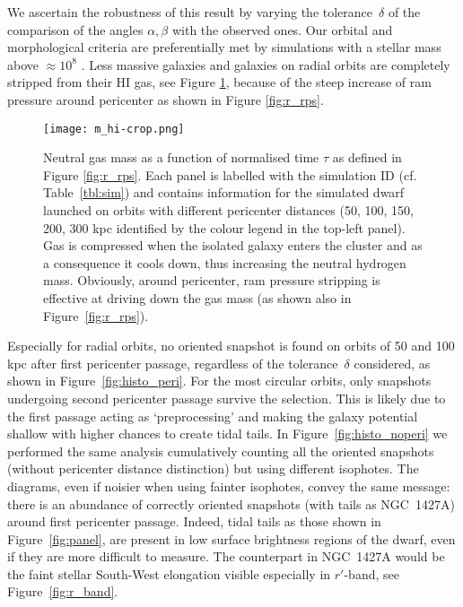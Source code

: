 We ascertain the robustness of this result by varying the tolerance~$\delta$ of the comparison of the angles $\alpha, \beta$ with the observed ones.
Our orbital and morphological criteria are preferentially met by simulations with a stellar mass above $ \approx10^8 $ \Msun{}.
Less massive galaxies and galaxies on radial orbits are completely stripped from their HI gas, see Figure \ref{fig:m_hi}, because of the steep increase of ram pressure around pericenter as shown in Figure \ref{fig:r_rps}.
\begin{figure}
\centering
\texttt{[image: m\_hi-crop.png]}
\caption{Neutral gas mass as a function of normalised time $\tau$ as defined in Figure \ref{fig:r_rps}.
Each panel is labelled with the simulation ID (cf. Table~\ref{tbl:sim}) and contains information for the simulated dwarf launched on orbits with different pericenter distances (50, 100, 150, 200, 300 kpc identified by the colour legend in the top-left panel). Gas is compressed when the isolated galaxy enters the cluster and as a consequence it cools down, thus increasing the neutral hydrogen mass. Obviously, around pericenter, ram pressure stripping is effective at driving down the gas mass (as shown also in Figure~\ref{fig:r_rps}).
}
\label{fig:m_hi}
\end{figure}
Especially for radial orbits, no oriented snapshot is found on orbits of 50 and 100 kpc after first pericenter passage, regardless of the tolerance~$\delta$ considered, as shown in Figure~\ref{fig:histo_peri}.
For the most circular orbits, only snapshots undergoing second pericenter passage survive the selection. This is likely due to the first passage acting as `preprocessing' and making the galaxy potential shallow with higher chances to create tidal tails.
In Figure~\ref{fig:histo_noperi} we performed the same analysis cumulatively counting all the oriented snapshots (without pericenter distance distinction) but using different isophotes.
The diagrams, even if noisier when using fainter isophotes, convey the same message: there is an abundance of correctly oriented snapshots (with tails as NGC~1427A) around first pericenter passage.
Indeed, tidal tails as those shown in Figure~\ref{fig:panel}, are present in low surface brightness regions of the dwarf, even if they are more difficult to measure.
The counterpart in NGC~1427A would be the faint stellar South-West elongation visible especially in $r'$-band, see Figure~\ref{fig:r_band}.

